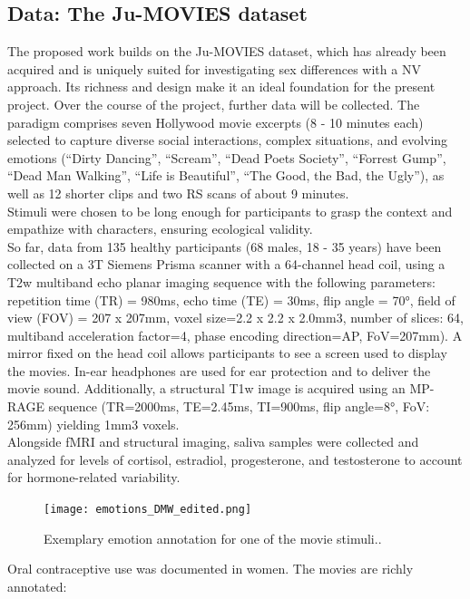 \documentclass[11pt,a4paper]{article}
\begin{document}
\subsection*{Data: The Ju-MOVIES dataset}
The proposed work builds on the Ju-MOVIES dataset, which has already been acquired and is 
uniquely suited for investigating sex differences with a NV approach. Its richness and design make it an ideal foundation for the present project. 
Over the course of the project, further data will be collected.
The paradigm comprises seven Hollywood movie excerpts (8 - 10 minutes each) selected to capture diverse social 
interactions, complex situations, and evolving emotions (“Dirty Dancing”, “Scream”, “Dead Poets Society”, “Forrest Gump”, “Dead Man Walking”, “Life is Beautiful”, 
“The Good, the Bad, the Ugly”), as well as 12 shorter clips and two RS scans of about 9 minutes. \\
Stimuli were chosen to be long enough for participants to grasp the context and empathize with characters, 
ensuring ecological validity.\\
So far, data from 135 healthy participants (68 males, 18 - 35 years) have been collected on a 3T Siemens Prisma scanner
with a 64-channel head coil, using a T2w multiband echo planar imaging sequence with the 
following parameters: repetition time (TR) = 980ms, echo time (TE) = 30ms, flip angle = 70°, field of view 
(FOV) = 207 x 207mm, voxel size=2.2 x 2.2 x 2.0mm3, number of slices: 64, multiband acceleration factor=4, 
phase encoding direction=AP,  FoV=207mm). A mirror fixed on the head coil allows participants to see a screen used 
to display the movies. In-ear headphones are used for ear protection and to deliver the movie sound. 
Additionally, a structural T1w image is acquired using an MP-RAGE sequence (TR=2000ms, TE=2.45ms, TI=900ms, 
flip angle=8°, FoV: 256mm) yielding 1mm3 voxels.\\
Alongside fMRI and structural imaging, saliva samples were collected and analyzed for levels of 
cortisol, estradiol, progesterone, and testosterone to account for hormone-related variability. 
\begin{figure} %
  \vspace{-10pt} %
  \texttt{[image: emotions\_DMW\_edited.png]}
  \caption{Exemplary emotion annotation for one of the movie stimuli..}
  \label{fig:dmw}
\end{figure}Oral contraceptive use was documented in women.
The movies are richly annotated: 
\end{document}
